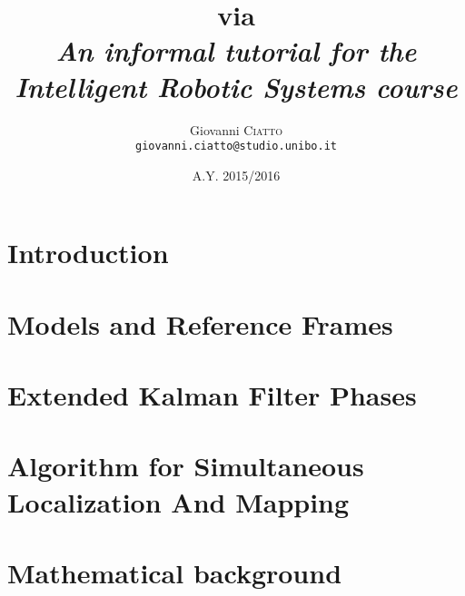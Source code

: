 \documentclass[a4paper,12pt]{article}
\title{
	\textbf{
		\Slam{} via \Ekf{}
	} \\
	{\normalsize\textit{
		An informal tutorial for the \emph{Intelligent Robotic Systems} course
	}}
}
\author{
	Giovanni \textsc{Ciatto} \\ \texttt{giovanni.ciatto@studio.unibo.it} \\
}
\date{A.Y. 2015/2016}
\numberwithin{equation}{section}
\theoremstyle{remark}
\newcommand{\Slam}{Simultaneous Localization And Mapping}
\newcommand{\Ekf}{Extended Kalman Filter}
\begin{document}
	
	\maketitle
	
	\section{Introduction}
		
		
	\section{Models and Reference Frames}
		
		
	\section{\Ekf{} Phases}
		\label{sec.ekf_phases}
		
		
	\section{Algorithm for \Slam{}}
		
	\newpage
	\appendix
	\section{Mathematical background}
		
	
	\newpage
	{}
	
			
\end{document}
